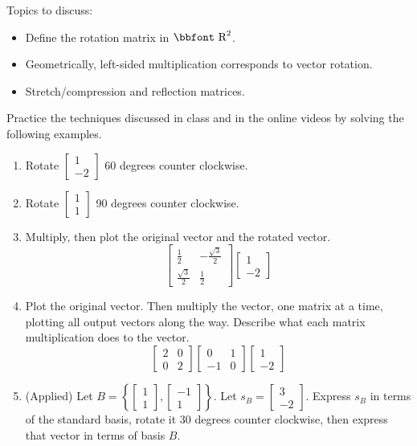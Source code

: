 \documentclass[10pt]{book}
\theoremstyle{definition}
\theoremstyle{remark}
\newcommand{\bbR}{\mathbb{R}}
\def\bbR{\mbox{\bbfont R}}
\begin{document}
\begin{large}
\noindent
Topics to discuss:
\begin{itemize}
\item Define the rotation matrix in $\bbR^{2}$.
\item Geometrically, left-sided multiplication corresponds to vector rotation.
\item Stretch/compression and reflection matrices. 
\end{itemize}
\newpage

\noindent
Practice the techniques discussed in class and in the online videos by solving the following examples. 
\begin{enumerate}
\item Rotate $\begin{bmatrix}1 \\ -2 \end{bmatrix}$ 60 degrees counter clockwise.\vfil\vfil
\item Rotate $\begin{bmatrix}1 \\ 1 \end{bmatrix}$ 90 degrees counter clockwise.\vfil
\newpage

\item Multiply, then plot the original vector and the rotated vector.
$$\begin{bmatrix} \frac{1}{2} & -\frac{\sqrt{3}}{2} \\ \frac{\sqrt{3}}{2} & \frac{1}{2} \end{bmatrix}\begin{bmatrix}1 \\ -2 \end{bmatrix}$$ \vfil\vfil

\item Plot the original vector. Then multiply the vector, one matrix at a time, plotting all output vectors along the way. Describe what each matrix multiplication does to the vector. 
$$\begin{bmatrix} 2 & 0 \\ 0 & 2 \end{bmatrix} \begin{bmatrix} 0 & 1 \\ -1 & 0 \end{bmatrix} \begin{bmatrix}1 \\ -2 \end{bmatrix}$$ \vfil
\newpage

\item (Applied) Let $B = \left\{\begin{bmatrix} 1 \\ 1 \end{bmatrix}, \begin{bmatrix}-1 \\ 1 \end{bmatrix}\right \}$.  Let $s_B = \begin{bmatrix} 3 \\ -2 \end{bmatrix}$.  Express $s_B$ in terms of the standard basis, rotate it 30 degrees counter clockwise, then express that vector in terms of basis $B$.\vfil\vfil
\end{enumerate}
\end{large}
\end{document}
